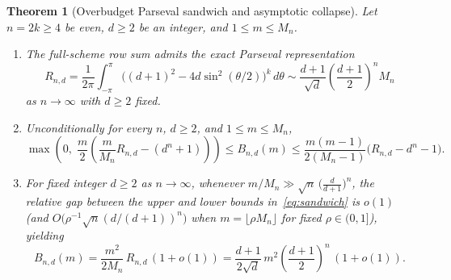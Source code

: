 \documentclass[11pt,reqno]{amsart}
\newtheorem{theorem}{Theorem}
\theoremstyle{definition}
\theoremstyle{remark}
\begin{document}
\begin{theorem}[Overbudget Parseval sandwich and asymptotic collapse]\label{thm:asymptotic}
Let $n = 2k \ge 4$ be even, $d \ge 2$ be an integer, and $1 \le m \le M_n$.
\begin{enumerate}
\item[(a)] The full-scheme row sum admits the exact Parseval representation
\begin{equation}\label{eq:parseval}
R_{n,d} = \frac{1}{2\pi} \int_{-\pi}^{\pi} \bigl((d+1)^2 - 4d\sin^2(\theta/2)\bigr)^k \, d\theta \sim \frac{d+1}{\sqrt{d}} \left(\frac{d+1}{2}\right)^n M_n
\end{equation}
as $n \to \infty$ with $d \ge 2$ fixed.
\item[(b)] Unconditionally for every $n$, $d \ge 2$, and $1 \le m \le M_n$,
\begin{equation}\label{eq:sandwich}
\max\!\left(0,\; \frac{m}{2}\!\left(\frac{m}{M_n} R_{n,d} - (d^n + 1)\right)\right) \le B_{n,d}(m) \le \frac{m(m-1)}{2(M_n - 1)}\bigl(R_{n,d} - d^n - 1\bigr).
\end{equation}
\item[(c)] For fixed integer $d \ge 2$ as $n \to \infty$, whenever $m/M_n \gg \sqrt{n}\,\bigl(\frac{d}{d+1}\bigr)^n$, the relative gap between the upper and lower bounds in~\eqref{eq:sandwich} is $o(1)$ (and $O\bigl(\rho^{-1}\sqrt{n}(d/(d+1))^n\bigr)$ when $m = \lfloor \rho M_n \rfloor$ for fixed $\rho \in (0,1]$), yielding
\[
B_{n,d}(m) = \frac{m^2}{2M_n}\,R_{n,d}\,(1 + o(1)) = \frac{d+1}{2\sqrt{d}}\,m^2\left(\frac{d+1}{2}\right)^n\,(1 + o(1)).
\]
\end{enumerate}
\end{theorem}
\end{document}

